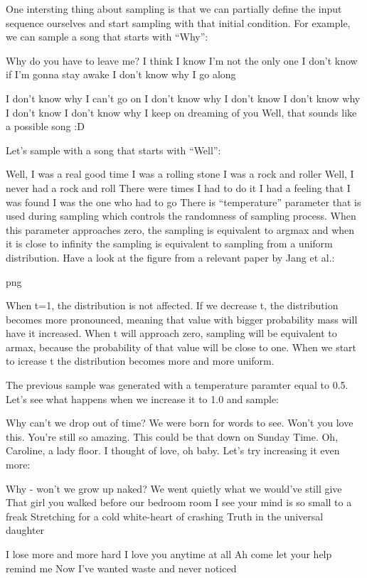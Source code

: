 \documentclass{article}
\begin{document}
One intersting thing about sampling is that we can partially define the input sequence ourselves and start sampling with that initial condition. For example, we can sample a song that starts with “Why”:

Why do you have to leave me?  
I think I know I'm not the only one  
I don't know if I'm gonna stay awake  
I don't know why I go along  
  
I don't know why I can't go on  
I don't know why I don't know  
I don't know why I don't know  
I don't know why I keep on dreaming of you   
Well, that sounds like a possible song :D

Let’s sample with a song that starts with “Well”:

Well, I was a real good time  
I was a rolling stone  
I was a rock and roller  
Well, I never had a rock and roll  
There were times I had to do it  
I had a feeling that I was found  
I was the one who had to go  
There is “temperature” parameter that is used during sampling which controls the randomness of sampling process. When this parameter approaches zero, the sampling is equivalent to argmax and when it is close to infinity the sampling is equivalent to sampling from a uniform distribution. Have a look at the figure from a relevant paper by Jang et al.:

png

When t=1, the distribution is not affected. If we decrease t, the distribution becomes more pronounced, meaning that value with bigger probability mass will have it increased. When t will approach zero, sampling will be equivalent to armax, because the probability of that value will be close to one. When we start to icrease t the distribution becomes more and more uniform.

The previous sample was generated with a temperature paramter equal to 0.5. Let’s see what happens when we increase it to 1.0 and sample:

Why can't we drop out of time?  
We were born for words to see.  
Won't you love this. You're still so amazing.  
This could be that down on Sunday Time.  
Oh, Caroline, a lady floor.  
I thought of love, oh baby.  
Let’s try increasing it even more:

Why - won't we grow up naked?  
We went quietly what we would've still give  
That girl you walked before our bedroom room  
I see your mind is so small to a freak  
Stretching for a cold white-heart of crashing  
Truth in the universal daughter  
  
I lose more and more hard  
I love you anytime at all  
Ah come let your help remind me  
Now I've wanted waste and never noticed  
  
\end{document}

